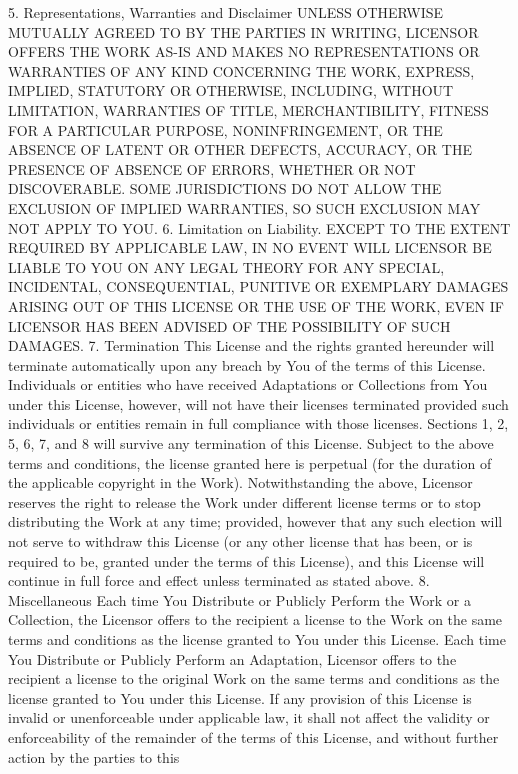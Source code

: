 \documentclass[oneside]{book}
\begin{document}
5. Representations, Warranties and Disclaimer UNLESS OTHERWISE MUTUALLY AGREED
TO BY THE PARTIES IN WRITING, LICENSOR OFFERS THE WORK AS-IS AND MAKES NO
REPRESENTATIONS OR WARRANTIES OF ANY KIND CONCERNING THE WORK, EXPRESS, IMPLIED,
STATUTORY OR OTHERWISE, INCLUDING, WITHOUT LIMITATION, WARRANTIES OF TITLE,
MERCHANTIBILITY, FITNESS FOR A PARTICULAR PURPOSE, NONINFRINGEMENT, OR THE
ABSENCE OF LATENT OR OTHER DEFECTS, ACCURACY, OR THE PRESENCE OF ABSENCE OF
ERRORS, WHETHER OR NOT DISCOVERABLE. SOME JURISDICTIONS DO NOT ALLOW THE
EXCLUSION OF IMPLIED WARRANTIES, SO SUCH EXCLUSION MAY NOT APPLY TO YOU.
6. Limitation on Liability.  EXCEPT TO THE EXTENT REQUIRED BY APPLICABLE LAW, IN
NO EVENT WILL LICENSOR BE LIABLE TO YOU ON ANY LEGAL THEORY FOR ANY SPECIAL,
INCIDENTAL, CONSEQUENTIAL, PUNITIVE OR EXEMPLARY DAMAGES ARISING OUT OF THIS
LICENSE OR THE USE OF THE WORK, EVEN IF LICENSOR HAS BEEN ADVISED OF THE
POSSIBILITY OF SUCH DAMAGES.  7. Termination This License and the rights granted
hereunder will terminate automatically upon any breach by You of the terms of
this License. Individuals or entities who have received Adaptations or
Collections from You under this License, however, will not have their licenses
terminated provided such individuals or entities remain in full compliance with
those licenses. Sections 1, 2, 5, 6, 7, and 8 will survive any termination of
this License.  Subject to the above terms and conditions, the license granted
here is perpetual (for the duration of the applicable copyright in the
Work). Notwithstanding the above, Licensor reserves the right to release the
Work under different license terms or to stop distributing the Work at any time;
provided, however that any such election will not serve to withdraw this License
(or any other license that has been, or is required to be, granted under the
terms of this License), and this License will continue in full force and effect
unless terminated as stated above.  8. Miscellaneous Each time You Distribute or
Publicly Perform the Work or a Collection, the Licensor offers to the recipient
a license to the Work on the same terms and conditions as the license granted to
You under this License.  Each time You Distribute or Publicly Perform an
Adaptation, Licensor offers to the recipient a license to the original Work on
the same terms and conditions as the license granted to You under this License.
If any provision of this License is invalid or unenforceable under applicable
law, it shall not affect the validity or enforceability of the remainder of the
terms of this License, and without further action by the parties to this
\end{document}
